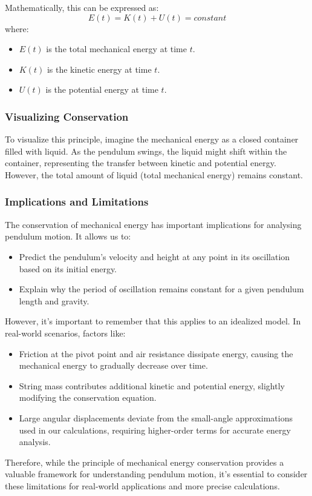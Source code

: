 \bigskip

\noindent Mathematically, this can be expressed as:
\[E(t) = K(t) + U(t) = constant\]
where:
\begin{itemize}
	\item $E(t)$ is the total mechanical energy at time $t$.
	\item $K(t)$ is the kinetic energy at time $t$.
	\item $U(t)$ is the potential energy at time $t$.
\end{itemize}

\subsubsection{Visualizing Conservation}

To visualize this principle, imagine the mechanical energy as a closed container filled with liquid. As the pendulum swings, the liquid might shift within the container, representing the transfer between kinetic and potential energy. However, the total amount of liquid (total mechanical energy) remains constant.

\newpage
\thispagestyle{plain}

\subsubsection{Implications and Limitations}

The conservation of mechanical energy has important implications for analysing pendulum motion. It allows us to:

\begin{itemize}
	\item Predict the pendulum's velocity and height at any point in its oscillation based on its initial energy.
	\item Explain why the period of oscillation remains constant for a given pendulum length and gravity.
\end{itemize}

However, it's important to remember that this applies to an idealized model. In real-world scenarios, factors like:

\begin{itemize}
	\item Friction at the pivot point and air resistance dissipate energy, causing the mechanical energy to gradually decrease over time.
	\item String mass contributes additional kinetic and potential energy, slightly modifying the conservation equation.
	\item Large angular displacements deviate from the small-angle approximations used in our calculations, requiring higher-order terms for accurate energy analysis.
\end{itemize}

Therefore, while the principle of mechanical energy conservation provides a valuable framework for understanding pendulum motion, it's essential to consider these limitations for real-world applications and more precise calculations.
